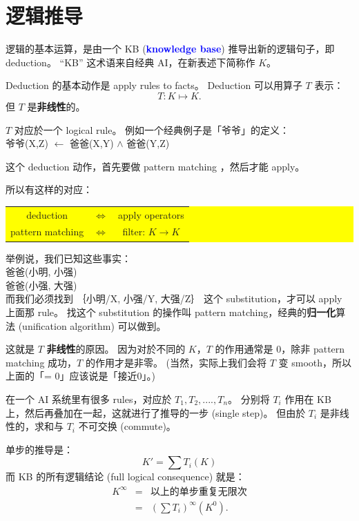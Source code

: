 \documentclass[12pt]{article}
\newcommand{\concept}[1]{\textbf{\textcolor{blue}{#1}}}
\newcommand{\formula}[1]{\textcolor{LogicColor}{#1}}
\newcommand{\tab}{\hspace*{1cm}}
\begin{document}
\section{逻辑推导}

逻辑的基本运算，是由一个 KB (\concept{knowledge base}) 推导出新的逻辑句子，即  deduction。 ``KB'' 这术语来自经典 AI，在新表述下简称作 $K$。

Deduction 的基本动作是 apply rules to facts。 Deduction 可以用算子 $T$ 表示：
$$ T: K \mapsto K .$$
但 $T$ 是\textbf{非线性}的。

$T$ 对应於一个 logical rule。  例如一个经典例子是「爷爷」的定义：\\
\tab \formula{ 爷爷(X,Z) $\leftarrow$ 爸爸(X,Y) $\wedge$ 爸爸(Y,Z)}

这个 deduction 动作，首先要做 pattern matching ，然后才能 apply。

所以有这样的对应：
\begin{center}
\colorbox{yellow}{\parbox{0.55\textwidth}{
\begin{tabular}{ccc}
deduction & $\Leftrightarrow$ & apply operators \\
pattern matching & $\Leftrightarrow$ & filter: $K \rightarrow K$ \\ 
\end{tabular}
}}
\end{center}

举例说，我们已知这些事实：\\
\tab \formula{爸爸(小明, 小强)} \\
\tab \formula{爸爸(小强, 大强)} \\
而我们必须找到 ｛小明/X, 小强/Y, 大强/Z｝ 这个 substitution，才可以 apply 上面那 rule。  找这个 substitution 的操作叫 pattern matching，经典的\textbf{归一化}算法 (unification algorithm) 可以做到。

这就是 $T$ \textbf{非线性}的原因。  因为对於不同的 $K$，$T$ 的作用通常是 0，除非 pattern matching 成功，$T$ 的作用才是非零。 (当然，实际上我们会将 $T$ 变 smooth，所以上面的「= 0」应该说是「接近0」。)

在一个 AI 系统里有很多 rules，对应於 $T_1, T_2, ...., T_n$。  分别将 $T_i$ 作用在 KB 上，然后再叠加在一起，这就进行了推导的一步 (single step)。  但由於 $T_i$ 是非线性的，求和与 $T_i$ 不可交换 (commute)。

单步的推导是：
     $$ K' = \sum T_i (K) $$
而 KB 的所有逻辑结论 (full logical consequence) 就是：
\begin{eqnarray} \nonumber
K^\infty & = & \mbox{以上的单步重复无限次} \\ \nonumber
         & = &  (\sum T_i) ^\infty (K^0) .
\end{eqnarray}
\end{document}
